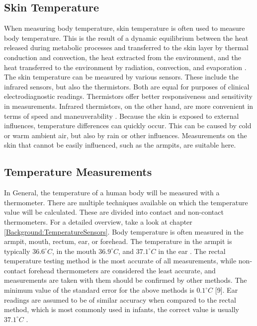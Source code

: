 \subsection{Skin Temperature}
\label{Background:BodyTemperature:SkinTemperature}
When measuring body temperature, skin temperature is often used to measure body temperature.
This is the result of a dynamic equilibrium between the heat released during metabolic processes and transferred to the skin layer by thermal conduction and convection, the heat extracted from the environment, and the heat transferred to the environment by radiation, convection, and evaporation \cite{dolibogComparativeAnalysisHuman2022}.
The skin temperature can be measured by various sensors. 
These include the infrared sensors, but also the thermistors. 
Both are equal for purposes of clinical electrodiagnostic readings.
Thermistors offer better responsiveness and sensitivity in measurements.
Infrared thermistors, on the other hand, are more convenient in terms of speed and maneuverability \cite{burnhamThreeTypesSkinSurface2006}.
Because the skin is exposed to external influences, temperature differences can quickly occur.
This can be caused by cold or warm ambient air, but also by rain or other influences.
Measurements on the skin that cannot be easily influenced, such as the armpits, are suitable here.

\subsection{Temperature Measurements}
\label{Background:BodyTemperature:TemperatureMeasurements}
In General, the temperature of a human body will be measured with a thermometer.
There are multiple techniques available on which the temperature value will be calculated. 
These are divided into contact and non-contact thermometers.
For a detailed overview, take a look at chapter \ref{Background:TemperatureSensors}.
Body temperature is often measured in the armpit, mouth, rectum, ear, or forehead.
The temperature in the armpit is typically $36.6^\circ C$, in the mouth $36.9^\circ C$, and $37.1^\circ C$ in the ear \cite{dolibogComparativeAnalysisHuman2022}.
The rectal temperature testing method is the most accurate of all measurements, while non-contact forehead thermometers are considered the least accurate, and measurements are taken with them should be confirmed by other methods.
The minimum value of the standard error for the above methods is $0.1^\circ C$ [9].
Ear readings are assumed to be of similar accuracy when compared to the rectal method, which is most commonly used in infants, the correct value is usually $37.1^\circ C$ \cite{dolibogComparativeAnalysisHuman2022}.

